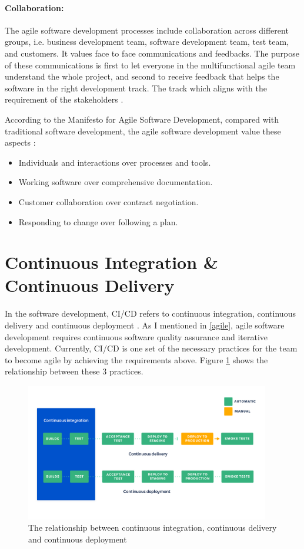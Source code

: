 \paragraph{Collaboration:}
The agile software development processes include collaboration across different groups, i.e. business development team, software development team, test team, and customers. It values face to face communications \cite{beck2001principles} and feedbacks. The purpose of these communications is first to let everyone in the multifunctional agile team understand the whole project, and second to receive feedback that helps the software in the right development track. The track which aligns with the requirement of the stakeholders \cite{beck2001manifesto}. 
\par
According to the Manifesto for Agile Software Development, compared with traditional software development, the agile software development value these aspects \cite{beck2001manifesto}: 
\begin{itemize}
\item Individuals and interactions over processes and tools.
\item Working software over comprehensive documentation.
\item Customer collaboration over contract negotiation.
\item Responding to change over following a plan.
\end{itemize}
\section{Continuous Integration \& Continuous Delivery}
In the software development, CI/CD refers to continuous integration, continuous delivery and continuous deployment \cite{pittet2018continuous}. As I mentioned in \ref{agile}, agile software development requires continuous software quality assurance and iterative development. Currently, CI/CD is one set of the necessary practices for the team to become agile by achieving the requirements above. Figure \ref{fig:cicd} shows the relationship between these 3 practices.
\begin{figure}[h]
    \centering
    \includegraphics[width=0.95\textwidth]{pics/cicd.png}
    \caption{The relationship between continuous integration, continuous delivery and continuous deployment \cite{pittet2018continuous}}
    \label{fig:cicd}
\end{figure}
